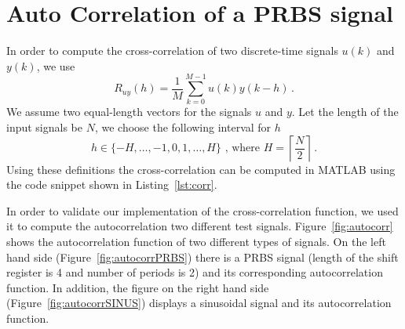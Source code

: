 \documentclass{scrartcl}
\newcommand*{\matlabcode}[3]{\begin{figure}[h!]\end{figure}}
\begin{document}
\section{Auto Correlation of a PRBS signal}
In order to compute the cross-correlation of two discrete-time signals $u(k)$ and $y(k)$, we use 
\begin{equation}
	R_{uy}(h) = \frac{1}{M} \sum\limits_{k=0}^{M-1} u(k)y(k-h)\, .
\end{equation}
We assume two equal-length vectors for the signals $u$ and $y$. Let the length of the input signals be $N$, we choose the following interval for $h$
\begin{equation}
	h \in \{-H, \dots, -1, 0, 1, \dots, H\}\text{ , where } H = \left\lceil \frac{N}{2} \right\rceil \, .
\end{equation}
Using these definitions the cross-correlation can be computed in MATLAB using the code snippet shown in Listing~\ref{lst:corr}.

\matlabcode{../matlab/ce1/intcor.m}{Computing a discrete-time cross correlation of the signal u and y in matlab}{lst:corr}

In order to validate our implementation of the cross-correlation function, we used it to compute the autocorrelation two different test signals. 
Figure~\ref{fig:autocorr} shows the autocorrelation function of two different types of signals. 
On the left hand side (Figure~\ref{fig:autocorrPRBS}) there is a PRBS signal (length of the shift register is 4 and number of periods is 2) and its corresponding autocorrelation function. 
In addition, the figure on the right hand side (Figure~\ref{fig:autocorrSINUS}) displays a sinusoidal signal and its autocorrelation function.  
\end{document}
